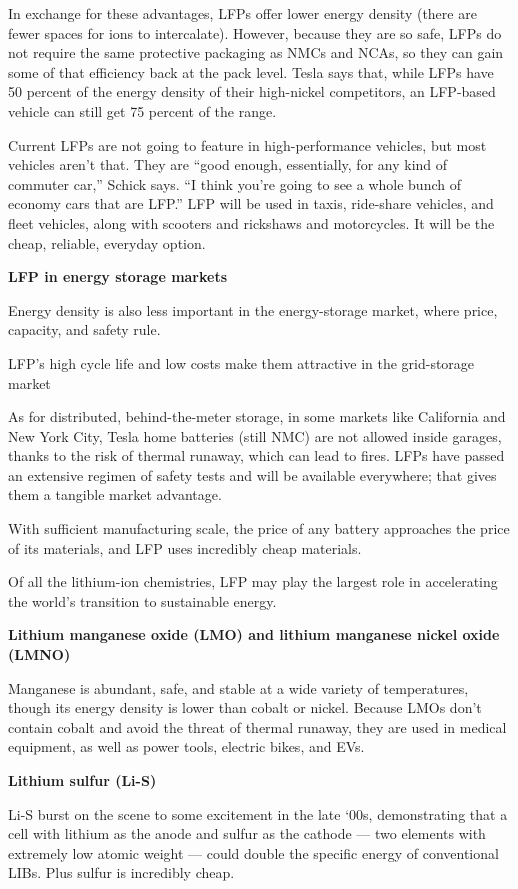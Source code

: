 \documentclass[
]{book}
\begin{document}
In exchange for these advantages, LFPs offer lower energy density (there are fewer spaces for ions to intercalate). However, because they are so safe, LFPs do not require the same protective packaging as NMCs and NCAs, so they can gain some of that efficiency back at the pack level. Tesla says that, while LFPs have 50 percent of the energy density of their high-nickel competitors, an LFP-based vehicle can still get 75 percent of the range.

Current LFPs are not going to feature in high-performance vehicles, but most vehicles aren't that. They are ``good enough, essentially, for any kind of commuter car,'' Schick says. ``I think you're going to see a whole bunch of economy cars that are LFP.'' LFP will be used in taxis, ride-share vehicles, and fleet vehicles, along with scooters and rickshaws and motorcycles. It will be the cheap, reliable, everyday option.

\textbf{LFP in energy storage markets}

Energy density is also less important in the energy-storage market, where price, capacity, and safety rule.

LFP's high cycle life and low costs make them attractive in the grid-storage market

As for distributed, behind-the-meter storage, in some markets like California and New York City, Tesla home batteries (still NMC) are not allowed inside garages, thanks to the risk of thermal runaway, which can lead to fires. LFPs have passed an extensive regimen of safety tests and will be available everywhere; that gives them a tangible market advantage.

With sufficient manufacturing scale, the price of any battery approaches the price of its materials, and LFP uses incredibly cheap materials.

Of all the lithium-ion chemistries, LFP may play the largest role in accelerating the world's transition to sustainable energy.

\textbf{Lithium manganese oxide (LMO) and lithium manganese nickel oxide (LMNO)}

Manganese is abundant, safe, and stable at a wide variety of temperatures, though its energy density is lower than cobalt or nickel. Because LMOs don't contain cobalt and avoid the threat of thermal runaway, they are used in medical equipment, as well as power tools, electric bikes, and EVs.

\textbf{Lithium sulfur (Li-S)}

Li-S burst on the scene to some excitement in the late `00s, demonstrating that a cell with lithium as the anode and sulfur as the cathode --- two elements with extremely low atomic weight --- could double the specific energy of conventional LIBs. Plus sulfur is incredibly cheap.
\end{document}
